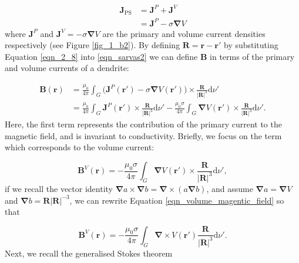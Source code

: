 \begin{equation}
\begin{aligned}
\mathbf{J}_\text{PS} &= \mathbf{J}^P+\mathbf{J}^V \\
&= \mathbf{J}^P - \sigma\mathbf{\nabla}V \label{eqn_2_8}
\end{aligned}
\end{equation} where $\mathbf{J}^P$ and $\mathbf{J}^V = - \sigma\mathbf{\nabla}V$ are the primary and volume current densities respectively (see Figure \ref{fig_1_b2}). By defining $\mathbf{R} = \mathbf{r}-\mathbf{r}'$ by substituting Equation \ref{eqn_2_8} into \ref{eqn_sarvas2} we can define $\mathbf{B}$ in terms of the primary and volume currents of a dendrite: 

\begin{equation}
	\begin{aligned}
		\mathbf{B}(\mathbf{r}) &= \frac{\mu_0}{4\pi}\int_{G}\Big(\mathbf{J}^P(\mathbf{r}')-\sigma\mathbf{\nabla}V(\mathbf{r}')\Big)\times\frac{\mathbf{R}}{|\mathbf{R}|^3}\text{d}\nu' \\
		&= \frac{\mu_0}{4\pi}\int_{G}\mathbf{J}^P(\mathbf{r}')\times\frac{\mathbf{R}}{|\mathbf{R}|^3}\text{d}\nu' - \frac{\mu_0\sigma}{4\pi}\int_{G}\mathbf{\nabla}V(\mathbf{r}')\times\frac{\mathbf{R}}{|\mathbf{R}|^3}\text{d}\nu'. \label{eqn_amplaplace}
	\end{aligned}
\end{equation} Here, the first term represents the contribution of the primary current to the magnetic field, and is invariant to conductivity. Briefly, we focus on the term which corresponds to the volume current: 

\begin{equation}
\mathbf{B}^V(\mathbf{r}) = - \frac{\mu_0\sigma}{4\pi}\int_{G}\mathbf{\nabla}V(\mathbf{r}')\times\frac{\mathbf{R}}{|\mathbf{R}|^3}\text{d}\nu',
\label{eqn_volume_magentic_field}
\end{equation}if we recall the vector identity $\mathbf{\nabla}a\times\mathbf{\nabla}b = \mathbf{\nabla}\times(a\mathbf{\nabla}b)$, and assume $\mathbf{\nabla}a=\mathbf{\nabla}V$ and $\mathbf{\nabla}b = \mathbf{R}|\mathbf{R}|^{-3}$, we can rewrite Equation \ref{eqn_volume_magentic_field} so that

\begin{equation}
\mathbf{B}^V(\mathbf{r}) = - \frac{\mu_0\sigma}{4\pi}\int_{G}\mathbf{\nabla}\times V(\mathbf{r}')\frac{\mathbf{R}}{|\mathbf{R}|^3}\text{d}\nu'. \label{eqn_stokes} 
\end{equation} Next, we recall the generalised Stokes theorem 

